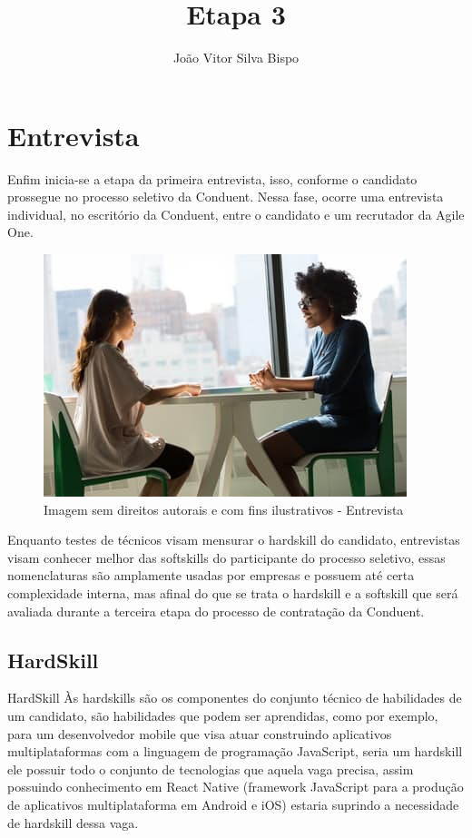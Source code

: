 \documentclass[12pt]{article}
\author{João Vitor Silva Bispo}
\title{Etapa 3}
\begin{document}
\maketitle

\section{Entrevista}
Enfim inicia-se a etapa da primeira entrevista, isso, conforme o candidato prossegue no processo seletivo da Conduent. 
Nessa fase, ocorre uma entrevista individual, no escritório da Conduent, entre o candidato e um recrutador da Agile One.

\begin{figure}[h]
	\centering
	\includegraphics[scale=0.5]{interview}
	\caption{Imagem sem direitos autorais e com fins ilustrativos - Entrevista}
	\label{fig:mesh1}
\end{figure}
Enquanto testes de técnicos visam mensurar o hardskill do candidato, entrevistas visam conhecer melhor das softskills do participante do processo seletivo, essas nomenclaturas são amplamente usadas por empresas e possuem até certa complexidade interna, mas afinal do que se trata o hardskill e a softskill que será avaliada durante a terceira etapa do processo de contratação da Conduent.

\subsection{HardSkill}
HardSkill
Às hardskills são os componentes do conjunto técnico de habilidades de um candidato, são habilidades que podem ser aprendidas, como por exemplo, para um desenvolvedor mobile que visa atuar construindo aplicativos multiplataformas com a linguagem de programação JavaScript, seria um hardskill ele possuir todo o conjunto de tecnologias que aquela vaga precisa, assim possuindo conhecimento em React Native (framework JavaScript para a produção de aplicativos multiplataforma em Android e iOS) estaria suprindo a necessidade de hardskill dessa vaga. 
\end{document}
